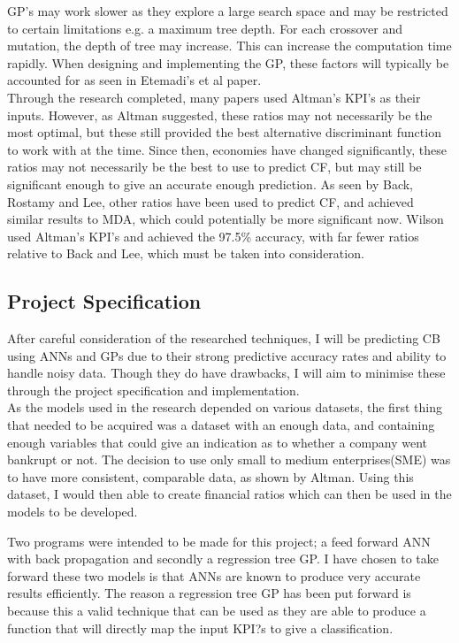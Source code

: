\documentclass[11pt]{article}
\begin{document}
GP's may work slower as they explore a large search space and may be restricted to certain limitations e.g. a maximum tree depth. For each crossover and mutation, the depth of tree may increase. This can increase the computation time rapidly. When designing and implementing the GP, these factors will typically be accounted for as seen in Etemadi's et al paper\cite{?}. \\

Through the research completed, many papers used Altman's KPI's as their inputs. However, as Altman suggested, these ratios may not necessarily be the most optimal, but these still provided the best alternative discriminant function to work with at the time\cite{?}. Since then, economies have changed significantly, these ratios may not necessarily be the best to use to predict CF, but may still be significant enough to give an accurate enough prediction. As seen by Back, Rostamy and Lee\cite{???}, other ratios have been used to predict CF, and achieved similar results to MDA, which could potentially be more significant now. Wilson used Altman's KPI's and achieved the 97.5\% accuracy, with far fewer ratios relative to Back and Lee, which must be taken into consideration\cite{?}.
\subsection{Project Specification}
After careful consideration of the researched techniques, I will be predicting CB using ANNs and GPs due to their strong predictive accuracy rates and ability to handle noisy data. Though they do have drawbacks, I will aim to minimise these through the project specification and implementation.\\

As the models used in the research depended on various datasets, the first thing that needed to be acquired was a dataset with an enough data, and containing enough variables that could give an indication as to whether a company went bankrupt or not. The decision to use only small to medium enterprises(SME) was to have more consistent, comparable data, as shown by Altman. Using this dataset, I would then able to create financial ratios which can then be used in the models to be developed. 

Two programs were intended to be made for this project; a feed forward ANN with back propagation and secondly a regression tree GP.  I have chosen to take forward these two models is that ANNs are known to produce very accurate results efficiently. The reason a regression tree GP has been put forward is because this a valid technique that can be used as they are able to produce a function that will directly map the input KPI?s to give a classification.
\end{document}
